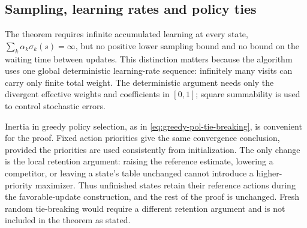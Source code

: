 \documentclass[twoside,11pt]{article}
\newcommand{\update}{\mu}
\newcommand{\discount}{\gamma}
\newcommand{\lrate}{\alpha}
\DeclareRobustCommand{\reviewbarstart}{%
  \ifhmode %
    \vadjust{\vbox to 0pt{%
      \vskip-\ht\strutbox %
      \vskip-\dp\strutbox %
      \cbstart[\changebarwidth] %
      \vss %
    }}%
  \else %
    \cbstart[\changebarwidth]%
  \fi %
} %
\providecommand{\DIFadd}[1]{#1} %
\providecommand{\DIFaddbegin}{\reviewbarstart} %
\providecommand{\DIFaddend}{\protect\cbend} %
\def\DIFadd#1{#1}%
\def\DIFaddbegin{}%
\def\DIFaddend{}%
\begin{document}



\subsection{ \DIFaddbegin \DIFadd{Sampling, learning rates and policy ties}\DIFaddend }
\label{sec: relaxing conditions}
\DIFaddbegin \DIFadd{The theorem requires infinite accumulated learning at every state, $\sum_k\alpha_k\sigma_k(s)=\infty$, but no positive lower sampling bound and no bound on the waiting time between updates. This distinction matters because the algorithm uses one global deterministic learning-rate sequence: infinitely many visits can carry only finite total weight. The deterministic argument needs only the divergent effective weights and coefficients in $[0,1]$; square summability is used to control stochastic errors.
}\DIFaddend 

 \DIFaddbegin \DIFadd{Inertia in greedy policy selection, as }\DIFaddend in \eqref{eq:greedy-pol-tie-breaking},  \DIFaddbegin \DIFadd{is convenient for the proof. Fixed action priorities give the same convergence conclusion, provided the priorities are used consistently from initialization. The only change is the local retention argument: raising the reference estimate, lowering a competitor, or leaving a state's table unchanged cannot introduce a higher-priority maximizer. Thus unfinished states retain their reference actions during the favorable-update construction}\DIFaddend , and the  \DIFaddbegin \DIFadd{rest of the proof is unchanged. Fresh random tie-breaking would require a different retention argument and is not included in the theorem as stated.
}\DIFaddend 
\end{document}
